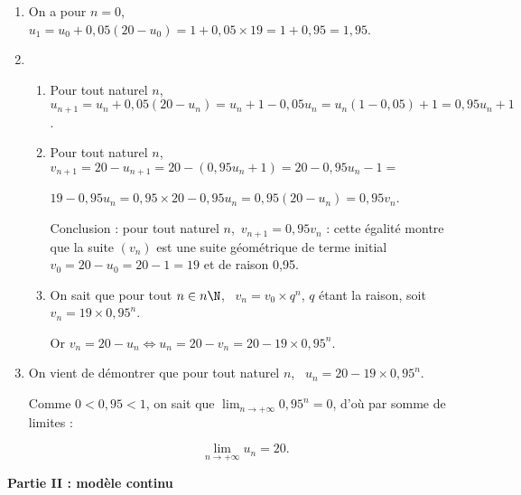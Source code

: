 \begin{enumerate}
\item %
On a pour $n = 0$, \, $u_1 = u_0 + 0,05(20 - u_0) = 1 + 0,05 \times 19 = 1 + 0,95 = 1,95$.
\item 
	\begin{enumerate}
		\item %
Pour tout naturel $n$, \, $u_{n+1} = u_n + 0,05\left(20 - u_n\right) = u_n  + 1 - 0,05u_n = u_n(1 - 0,05) + 1 = 0,95u_n + 1$.
		\item %
		
Pour tout naturel $n$, \, $v_{n+1} = 20 - u_{n+1} = 20 - \left(0,95u_n + 1\right) = 20 - 0,95u_n - 1 = $

$19 - 0,95u_n = 0,95 \times  20 - 0,95u_n = 0,95\left(20 - u_n \right) = 0,95v_n$.

Conclusion : pour tout naturel $n$,\, $v_{n+1} = 0,95v_n$ : cette égalité montre que la suite $\left(v_n\right)$ est une suite géométrique de terme initial $v_0 =  20 - u_0 =  20 - 1 = 19$ et de raison 0,95.
		\item %
On sait que pour tout $n \in n\N$, \, $v_n = v_0 \times q^n$, $q$ étant la raison, soit $v_n = 19  \times 0,95^n$.

Or $v_n = 20 - u_n \iff u_n = 20 - v_n = 20 - 19 \times 0,95^n$.
	\end{enumerate}
\item %
On vient de démontrer que pour tout naturel $n$, \, $u_n = 20 - 19\times 0,95^n$.

Comme $0 < 0,95 < 1$, on sait que $\displaystyle\lim_{n \to + \infty} 0,95^n = 0$, d'où par somme de limites :

\[\displaystyle\lim_{n \to + \infty} u_n = 20.\]
\end{enumerate}

\bigskip

\textbf{Partie II : modèle continu}

\medskip

%

